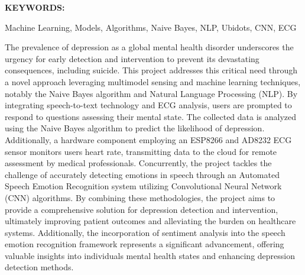 
\abstract
\noindent \textbf{KEYWORDS:} \hspace*{0.5em} \parbox[t]{4.4in}{Machine Learning, Models, Algorithms, Naive Bayes, NLP, Ubidots, CNN, ECG}

\vspace*{24pt}

\noindent The prevalence of depression as a global mental health disorder underscores the urgency for early detection and intervention to prevent its devastating consequences, including suicide. This project addresses this critical need through a novel approach leveraging multimodel sensing and machine learning techniques, notably the Naive Bayes algorithm and Natural Language Processing (NLP). By integrating speech-to-text technology and ECG analysis, users are prompted to respond to questions assessing their mental state. The collected data is analyzed using the Naive Bayes algorithm to predict the likelihood of depression. Additionally, a hardware component employing an ESP8266 and AD8232 ECG sensor monitors users heart rate, transmitting data to the cloud for remote assessment by medical professionals. Concurrently, the project tackles the challenge of accurately detecting emotions in speech through an Automated Speech Emotion Recognition system utilizing Convolutional Neural Network (CNN) algorithms. By combining these methodologies, the project aims to provide a comprehensive solution for depression detection and intervention, ultimately improving patient outcomes and alleviating the burden on healthcare systems. Additionally, the incorporation of sentiment analysis into the speech emotion recognition framework represents a significant advancement, offering valuable insights into individuals mental health states and enhancing depression detection methods.
\pagebreak
